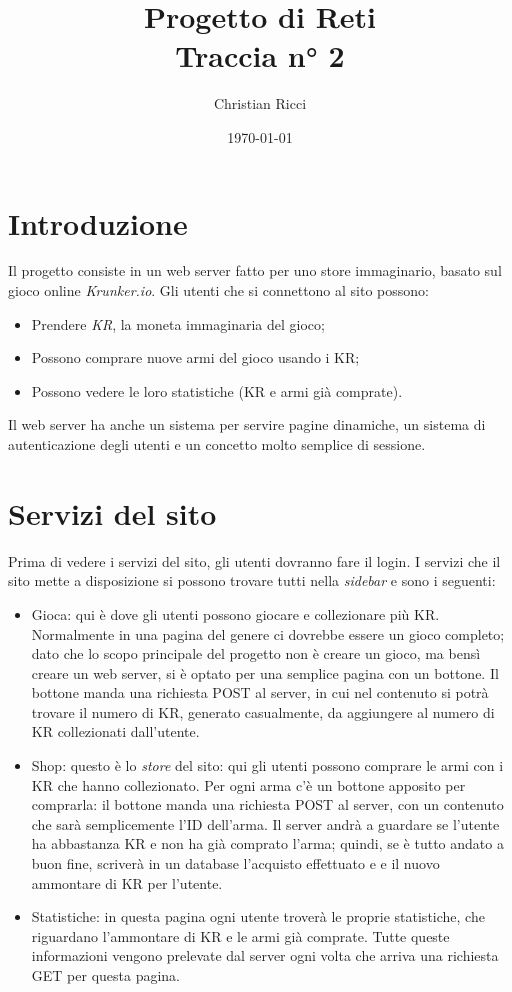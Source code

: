 \documentclass[a4paper,12pt]{report}
\title{Progetto di Reti \\
\large Traccia n° 2}
\author{Christian Ricci}
\date{\today}
\begin{document}
\maketitle
\tableofcontents

\chapter{Introduzione}

Il progetto consiste in un web server fatto per uno store immaginario, basato sul gioco online \textit{Krunker.io}. Gli utenti che si connettono al sito possono: 
\begin{itemize}
\item Prendere \textit{KR}, la moneta immaginaria del gioco;
\item Possono comprare nuove armi del gioco usando i KR;
\item Possono vedere le loro statistiche (KR e armi già comprate).
\end{itemize}
Il web server ha anche un sistema per servire pagine dinamiche, un sistema di autenticazione degli utenti e un concetto molto semplice di sessione.

\chapter{Servizi del sito}

Prima di vedere i servizi del sito, gli utenti dovranno fare il login. I servizi che il sito mette a disposizione si possono trovare tutti nella \textit{sidebar} e sono i seguenti:
\begin{itemize}
\item Gioca: qui è dove gli utenti possono giocare e collezionare più KR. Normalmente in una pagina del genere ci dovrebbe essere un gioco completo; dato che lo scopo principale del progetto non è creare un gioco, ma bensì creare un web server, si è optato per una semplice pagina con un bottone. Il bottone manda una richiesta POST al server, in cui nel contenuto si potrà trovare il numero di KR, generato casualmente, da aggiungere al numero di KR collezionati dall'utente.
\item Shop: questo è lo \textit{store} del sito: qui gli utenti possono comprare le armi con i KR che hanno collezionato. Per ogni arma c'è un bottone apposito per comprarla: il bottone manda una richiesta POST al server, con un contenuto che sarà semplicemente l'ID dell'arma. Il server andrà a guardare se l'utente ha abbastanza KR e non ha già comprato l'arma; quindi, se è tutto andato a buon fine, scriverà in un database l'acquisto effettuato e e il nuovo ammontare di KR per l'utente.
\item Statistiche: in questa pagina ogni utente troverà le proprie statistiche, che riguardano l'ammontare di KR e le armi già comprate. Tutte queste informazioni vengono prelevate dal server ogni volta che arriva una richiesta GET per questa pagina.
\end{itemize}
\end{document}
